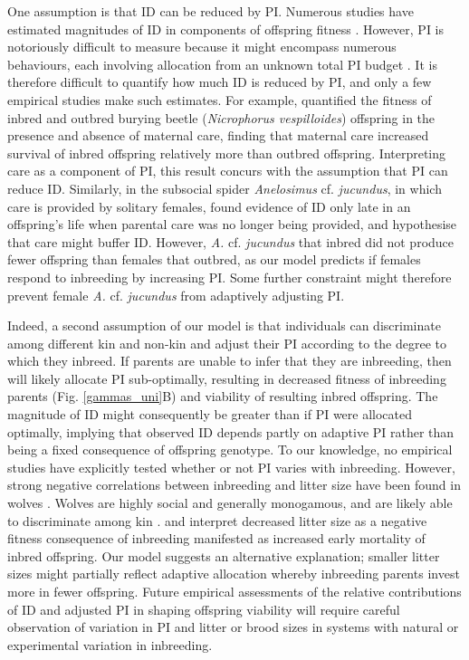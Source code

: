 \documentclass[10pt,letterpaper]{article}
\begin{document}
One assumption is that ID can be reduced by PI. Numerous studies have estimated magnitudes of ID in components of offspring fitness \cite[][]{Charlesworth2009, Szulkin2012}. However, PI is notoriously difficult to measure because it might encompass numerous behaviours, each involving allocation from an unknown total PI budget \cite[][]{Parker2002}. It is therefore difficult to quantify how much ID is reduced by PI, and only a few empirical studies make such estimates. For example, \cite{Pilakouta2015} quantified the fitness of inbred and outbred burying beetle (\textit{Nicrophorus vespilloides}) offspring in the presence and absence of maternal care, finding that maternal care increased survival of inbred offspring relatively more than outbred offspring. Interpreting care as a component of PI, this result concurs with the assumption that PI can reduce ID. Similarly, in the subsocial spider \textit{Anelosimus} cf. \textit{jucundus}, in which care is provided by solitary females, \cite{Aviles2006} found evidence of ID only late in an offspring's life when parental care was no longer being provided, and hypothesise that care might buffer ID. However, \textit{A.} cf. \textit{jucundus} that inbred did not produce fewer offspring than females that outbred, as our model predicts if females respond to inbreeding by increasing PI. Some further constraint might therefore prevent female \textit{A.} cf. \textit{jucundus} from adaptively adjusting PI.

Indeed, a second assumption of our model is that individuals can discriminate among different kin and non-kin and adjust their PI according to the degree to which they inbreed. If parents are unable to infer that they are inbreeding, then will likely allocate PI sub-optimally, resulting in decreased fitness of inbreeding parents (Fig. \ref{gammas_uni}B) and viability of resulting inbred offspring. The magnitude of ID might consequently be greater than if PI were allocated optimally, implying that observed ID depends partly on adaptive PI rather than being a fixed consequence of offspring genotype. To our knowledge, no empirical studies have explicitly tested whether or not PI varies with inbreeding. However, strong negative correlations between inbreeding and litter size have been found in wolves \cite[\textit{Canis lupus};][]{Liberg2005, Fredrickson2007}. Wolves are highly social and generally monogamous, and are likely able to discriminate among kin \cite[][]{Raikkonen2009, Geffen2011}. \cite{Liberg2005} and \cite{Fredrickson2007} interpret decreased litter size as a negative fitness consequence of inbreeding manifested as increased early mortality of inbred offspring. Our model suggests an alternative explanation; smaller litter sizes might partially reflect adaptive allocation whereby inbreeding parents invest more in fewer offspring. Future empirical assessments of the relative contributions of ID and adjusted PI in shaping offspring viability will require careful observation of variation in PI and litter or brood sizes in systems with natural or experimental variation in inbreeding.
\end{document}
